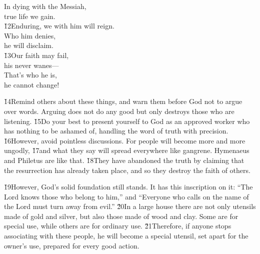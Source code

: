 \begin{poetry}
\poeml In dying with the Messiah, \\
\poemll    true life we gain. \\
\poeml \v{12}Enduring, we with him will reign. \\
\poemll    Who him denies, \\
\poemlll       he will disclaim. \\
\poeml \v{13}Our faith may fail, \\
\poemll    his never wanes--- \\
\poeml That's who he is, \\
\poemll    he cannot change!
\end{poetry}

\v{14}Remind others about these things, and warn them before God not to argue over words. Arguing does not do any good but only destroys those who are listening. \v{15}Do your best to present yourself to God as an approved worker who has nothing to be ashamed of, handling the word of truth with precision. \v{16}However, avoid pointless discussions. For people will become more and more ungodly, \v{17}and what they say will spread everywhere like gangrene. Hymenaeus and Philetus are like that. \v{18}They have abandoned the truth by claiming that the resurrection has already taken place, and so they destroy the faith of others.

\v{19}However, God's solid foundation still stands. It has this inscription on it: ``The Lord knows those who belong to him,'' and ``Everyone who calls on the name of the Lord must turn away from evil.'' \v{20}In a large house there are not only utensils made of gold and silver, but also those made of wood and clay. Some are for special use, while others are for ordinary use. \v{21}Therefore, if anyone stops associating with these people, he will become a special utensil, set apart for the owner's use, prepared for every good action.

